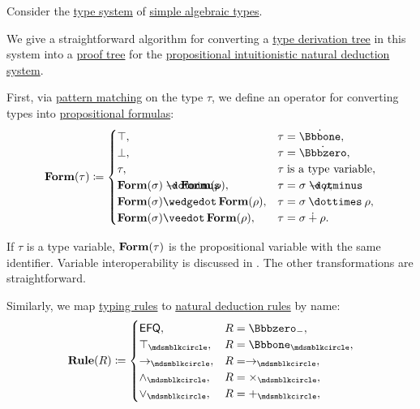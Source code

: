 \begin{algorithm}\label{alg:type_derivation_to_proof_tree}
  Consider the \hyperref[def:abstract_type_system]{type system} of \hyperref[def:simple_algebraic_types]{simple algebraic types}.

  We give a straightforward algorithm for converting a \hyperref[def:type_derivation_tree]{type derivation tree} in this system into a \hyperref[def:natural_deduction_proof_tree]{proof tree} for the \hyperref[def:propositional_natural_deduction_systems]{propositional intuitionistic natural deduction system}.

  \begin{thmenum}
     First, via \hyperref[con:evaluation]{pattern matching} on the type \( \tau \), we define an operator for converting types into \hyperref[def:propositional_syntax/formula]{propositional formulas}:
    \begin{equation*}
      \op*{Form}(\tau) \coloneqq \begin{cases}
        \top,                                            &\tau = \syn\Bbbone, \\
        \bot,                                            &\tau = \syn\Bbbzero, \\
        \tau,                                            &\tau \T{is a type variable}, \\
        \op*{Form}(\sigma) \synimplies \op*{Form}(\rho), &\tau = \sigma \synimplies \rho, \\
        \op*{Form}(\sigma) \synwedge \op*{Form}(\rho),   &\tau = \sigma \syntimes \rho, \\
        \op*{Form}(\sigma) \synvee \op*{Form}(\rho),     &\tau = \sigma \synplus \rho. \\
      \end{cases}
    \end{equation*}

    If \( \tau \) is a type variable, \( \op*{Form}(\tau) \) is the propositional variable with the same identifier. Variable interoperability is discussed in . The other transformations are straightforward.

     Similarly, we map \hyperref[def:simple_typing_rule]{typing rules} to \hyperref[def:natural_deduction_rule]{natural deduction rules} by name:
    \begin{equation*}
      \op*{Rule}(R) \coloneqq \begin{cases}
        \logic{EFQ},         &R = \Bbbzero_-, \\
        \top_{\Anon},        &R = \Bbbone_{\Anon}, \\
        \rightarrow_{\Anon}, &R = \rightarrow_{\Anon}, \\
        \wedge_{\Anon},      &R = \times_{\Anon}, \\
        \vee_{\Anon},        &R = +_{\Anon}, \\
      \end{cases}
    \end{equation*}


\end{thmenum}
\end{algorithm}
